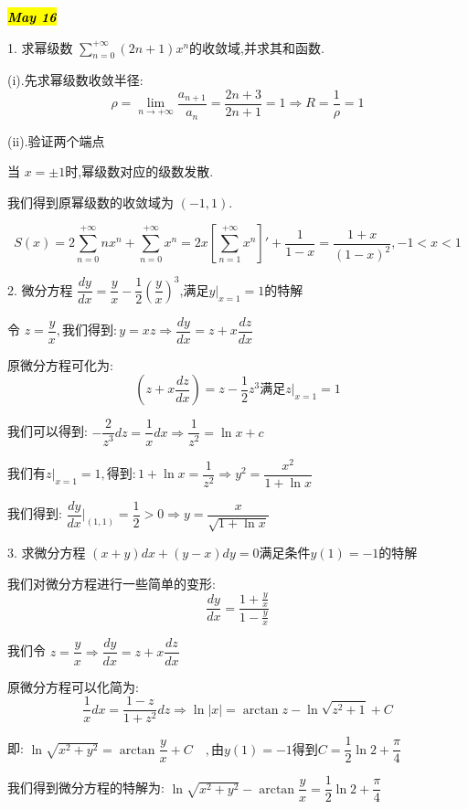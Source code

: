 
\hl{\textbf{\textit{May 16}}}

1. 求幂级数 $\sum\limits_{n=0}^{+\infty}(2n+1)x^n$的收敛域,并求其和函数.
\begin{solution}
	
	(i).先求幂级数收敛半径: 
	$$\rho=\lim\limits_{n\rightarrow +\infty}\frac{a_{n+1}}{a_{n}}=\frac{2n+3}{2n+1}=1\Rightarrow R=\frac{1}{\rho}=1$$
	
	(ii).验证两个端点
	
	当 $x=\pm1$时,幂级数对应的级数发散.
	
	我们得到原幂级数的收敛域为 $(-1,1)$.
	
	$$S(x)=2\sum\limits_{n=0}^{+\infty}nx^n+\sum\limits_{n=0}^{+\infty}x^n=2x[\sum\limits_{n=1}^{+\infty}x^n]'+\frac{1}{1-x}=\frac{1+x}{(1-x)^2},-1<x<1$$
\end{solution}


2. 微分方程 $\dfrac{dy}{dx}=\dfrac{y}{x}-\dfrac{1}{2}(\dfrac{y}{x})^3$,满足$y|_{x=1}=1$的特解
\begin{solution}
	
	令 $z=\dfrac{y}{x},\text{我们得到}: y=xz\Rightarrow \dfrac{dy}{dx}=z+x\dfrac{dz}{dx}$
	
	原微分方程可化为: 
	$$(z+x\frac{dz}{dx})=z-\frac{1}{2}z^3\text{满足} z| _{x=1}=1$$
	
	我们可以得到: $-\dfrac{2}{z^3}dz=\dfrac{1}{x}dx\Rightarrow \dfrac{1}{z^2}=\ln x+c$
	
	$\text{我们有}z| _{x=1}=1,\text{得到}: 1+\ln x=\dfrac{1}{z^2}\Rightarrow y^2=\dfrac{x^2}{1+\ln x}$
	
	我们得到: $\dfrac{dy}{dx}|_{(1,1)}=\dfrac{1}{2}>0\Rightarrow y=\dfrac{x}{\sqrt{1+\ln x}}$
	
\end{solution}


3. 求微分方程 $(x+y)dx+(y-x)dy=0\text{满足条件}y(1)=-1\text{的特解}$
\begin{solution}
	
	我们对微分方程进行一些简单的变形: 
	$$\frac{dy}{dx}=\dfrac{1+\frac{y}{x}}{1-\frac{y}{x}}$$
	
	我们令 $z=\dfrac{y}{x}\Rightarrow \dfrac{dy}{dx}=z+x\dfrac{dz}{dx}$
	
	原微分方程可以化简为: 
	$$\frac{1}{x}dx=\frac{1-z}{1+z^2}dz\Rightarrow \ln |x|=\arctan z-\ln \sqrt{z^2+1}+C$$
	
	即: $\ln\sqrt{x^2+y^2}=\arctan \dfrac{y}{x}+C\quad ,\text{由}y(1)=-1\text{得到} C=\dfrac{1}{2}\ln 2+\dfrac{\pi}{4}$
	
	我们得到微分方程的特解为: $\ln\sqrt{x^2+y^2}-\arctan \dfrac{y}{x}=\dfrac{1}{2}\ln 2+\dfrac{\pi}{4}$
\end{solution}

